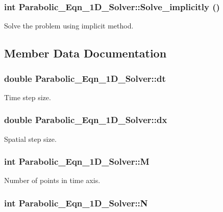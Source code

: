 \subsubsection{\setlength{\rightskip}{0pt plus 5cm}int Parabolic\_\-Eqn\_\-1D\_\-Solver::Solve\_\-implicitly ()}\label{classParabolic__Eqn__1D__Solver_db4631f67475f8e3d4d9e9d2421eff5d}


Solve the problem using implicit method. 

\subsection{Member Data Documentation}
\subsubsection{\setlength{\rightskip}{0pt plus 5cm}double \bf{Parabolic\_\-Eqn\_\-1D\_\-Solver::dt}}\label{classParabolic__Eqn__1D__Solver_7b6af7f87cb317dc61a5e798ed60b2c5}


Time step size. 

\subsubsection{\setlength{\rightskip}{0pt plus 5cm}double \bf{Parabolic\_\-Eqn\_\-1D\_\-Solver::dx}}\label{classParabolic__Eqn__1D__Solver_c761b86ba303296cb377c7a9b4993677}


Spatial step size. 

\subsubsection{\setlength{\rightskip}{0pt plus 5cm}int \bf{Parabolic\_\-Eqn\_\-1D\_\-Solver::M}}\label{classParabolic__Eqn__1D__Solver_90500740a60d592e7f4cba83dd74f614}


Number of points in time axis. 

\subsubsection{\setlength{\rightskip}{0pt plus 5cm}int \bf{Parabolic\_\-Eqn\_\-1D\_\-Solver::N}}\label{classParabolic__Eqn__1D__Solver_55769db6af40815292ac0600223164b5}


